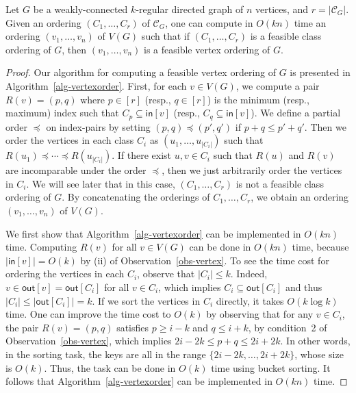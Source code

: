 \documentclass[english]{lipics-v2021}
\begin{document}
\begin{lemma} \label{lem-vertexorder}
    Let $G$ be a weakly-connected $k$-regular directed graph of $n$ vertices, and $r = |\mathcal{C}_G|$.
    Given an ordering $(C_1,\dots,C_r)$ of $\mathcal{C}_G$, one can compute in $O(kn)$ time an ordering $(v_1,\dots,v_n)$ of $V(G)$ such that if $(C_1,\dots,C_r)$ is a feasible class ordering of $G$, then $(v_1,\dots,v_n)$ is a feasible vertex ordering of $G$.
\end{lemma}
\begin{proof}
Our algorithm for computing a feasible vertex ordering of $G$ is presented in Algorithm~\ref{alg-vertexorder}.
First, for each $v \in V(G)$, we compute a pair $R(v) = (p,q)$ where $p \in [r]$ (resp., $q \in [r]$) is the minimum (resp., maximum) index such that $C_p \subseteq \mathsf{in}[v]$ (resp., $C_q \subseteq \mathsf{in}[v]$).
We define a partial order $\preceq$ on index-pairs by setting $(p,q) \preceq (p',q')$ if $p+q \leq p'+q'$.
Then we order the vertices in each class $C_i$ as $(u_1,\dots,u_{|C_i|})$ such that $R(u_1) \preceq \cdots \preceq R(u_{|C_i|})$.
If there exist $u,v \in C_i$ such that $R(u)$ and $R(v)$ are incomparable under the order $\preceq$, then we just arbitrarily order the vertices in $C_i$.
We will see later that in this case, $(C_1,\dots,C_r)$ is not a feasible class ordering of $G$.
By concatenating the orderings of $C_1,\dots,C_r$, we obtain an ordering $(v_1,\dots,v_n)$ of $V(G)$.

We first show that Algorithm~\ref{alg-vertexorder} can be implemented in $O(kn)$ time.
Computing $R(v)$ for all $v \in V(G)$ can be done in $O(kn)$ time, because $|\mathsf{in}[v]| = O(k)$ by (ii) of Observation~\ref{obs-vertex}.
To see the time cost for ordering the vertices in each $C_i$, observe that $|C_i| \leq k$.
Indeed, $v \in \mathsf{out}[v] = \mathsf{out}[C_i]$ for all $v \in C_i$, which implies $C_i \subseteq \mathsf{out}[C_i]$ and thus $|C_i| \leq |\mathsf{out}[C_i]| = k$.
If we sort the vertices in $C_i$ directly, it takes $O(k \log k)$ time.
One can improve the time cost to $O(k)$ by observing that for any $v \in C_i$, the pair $R(v) = (p,q)$ satisfies $p \geq i-k$ and $q \leq i+k$, by condition~2 of Observation~\ref{obs-vertex}, which implies $2i-2k \leq p+q \leq 2i+2k$.
In other words, in the sorting task, the keys are all in the range $\{2i-2k,\dots,2i+2k\}$, whose size is $O(k)$.
Thus, the task can be done in $O(k)$ time using bucket sorting.
It follows that Algorithm~\ref{alg-vertexorder} can be implemented in $O(kn)$ time.


\end{proof}
\end{document}
